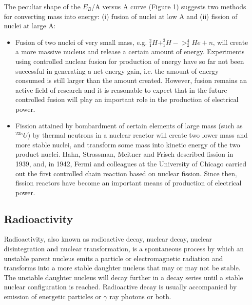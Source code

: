 \documentclass{article}
\begin{document}
The peculiar shape of the $E_B$/A versus A curve (Figure 1) suggests two
methods for converting mass into energy: (i) fusion of nuclei at low A and
(ii) fission of nuclei at large A:
\begin{itemize}
    \item Fusion of two nuclei of very small mass, e.g. $^2_1H + ^3_1H -> ^4_2He +n$, will
create a more massive nucleus and release a certain amount of energy. Experiments using controlled nuclear fusion for production of energy have so far not been successful in generating a net energy gain, i.e. the amount
of energy consumed is still larger than the amount created. However, fusion
remains an active field of research and it is reasonable to expect that in the
future controlled fusion will play an important role in the production of
electrical power.
\item Fission attained by bombardment of certain elements of large mass (such as
$^{235}U$) by thermal neutrons in a nuclear reactor will create two lower mass
and more stable nuclei, and transform some mass into kinetic energy of the
two product nuclei. Hahn, Strassman, Meitner and Frisch described fission
in 1939, and, in 1942, Fermi and colleagues at the University of Chicago
carried out the first controlled chain reaction based on nuclear fission. Since then, fission reactors have become an important means of production
of electrical power.
\end{itemize}
\subsection*{Radioactivity}
Radioactivity, also known as radioactive decay, nuclear decay, nuclear
disintegration and nuclear transformation, is a spontaneous process by which
an unstable parent nucleus emits a particle or electromagnetic radiation and
transforms into a more stable daughter nucleus that may or may not be stable.
The unstable daughter nucleus will decay further in a decay series until a stable
nuclear configuration is reached. Radioactive decay is usually accompanied by
emission of energetic particles or $\gamma$ ray photons or both.
\end{document}
